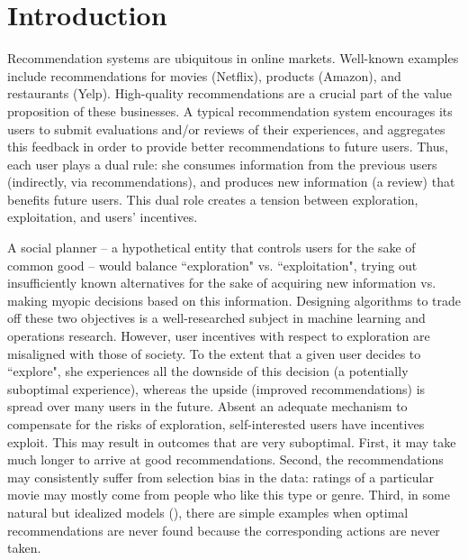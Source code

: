 \pagebreak
\section{Introduction}

Recommendation systems are ubiquitous in online markets. Well-known examples include recommendations for movies (\eg  Netflix), products (\eg  Amazon), and restaurants (\eg  Yelp).
High-quality recommendations are a crucial part of the value proposition of these businesses.
%
A typical recommendation system encourages its users to submit evaluations and/or reviews of their experiences, and aggregates this feedback in order to provide better recommendations to future users. Thus, each user plays a dual rule: she consumes information from the previous users (indirectly, via recommendations),
and produces new information (\eg  a review) that benefits future users. This dual role creates a tension between exploration, exploitation, and users' incentives.

A social planner -- a hypothetical entity that controls users for the sake of common good -- would balance ``exploration" vs.  ``exploitation", \ie  trying out insufficiently known alternatives for the sake of acquiring new information vs. making myopic decisions based on this information. Designing algorithms to trade off these two objectives is a well-researched subject in machine learning and operations research.
%
However, user incentives with respect to exploration are misaligned with those of society. To the extent that a given user decides to ``explore", she experiences all the downside of this decision (a potentially suboptimal experience), whereas the upside (improved recommendations) is spread over many users in the future. Absent an adequate mechanism to compensate for the risks of exploration, self-interested users have incentives exploit. This may result in outcomes that are very suboptimal. First, it may take much longer to arrive at good recommendations. Second, the recommendations may consistently suffer from selection bias in the data: \eg  ratings of a particular movie may mostly come from people who like this type or genre. Third, in some natural but idealized models (\eg  \cite{Kremer-JPE14,ICexploration-ec15}), there are simple  examples when optimal recommendations are never found because the corresponding actions are never taken.

